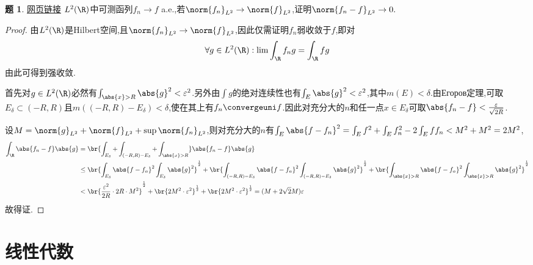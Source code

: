 \documentclass{article}
\theoremstyle{definition}
\newtheorem{exercise}{题}[section]
\begin{document}
\begin{exercise}
    \href{http://eufisky.is-programmer.com/tag/%E4%B8%98%E8%B5%9B}{网页链接}
    $L^2(\R)$中可测函列$f_n\to f$ a.e.,若$\norm{f_n}_{L^2}\to \norm{f}_{L^2}$,证明$\norm{f_n-f}_{L^2}\to 0.$
\end{exercise}
\begin{proof}
    由$L^2(\R)$是Hilbert空间,且$\norm{f_n}_{L^2}\to \norm{f}_{L^2}$,因此仅需证明$f_n$弱收敛于$f$,即对$$\forall g\in L^2(\R):\lim \int_\R f_ng=\int_{\R}fg$$由此可得到强收敛.

    首先对$g\in L^2(\R)$必然有$\int_{\abs{x}>R}\abs{g}^2<\varepsilon^2$.另外由$\int g$的绝对连续性也有$\int_{E}\abs{g}^2<\varepsilon^2$,其中$m(E)<\delta$.由Егоров定理,可取$E_\delta\subset (-R,R)$且$m((-R,R)-E_\delta)<\delta$,使在其上有$f_n\convergeuni f$.因此对充分大的$n$和任一点$x\in E_\delta$可取$\abs{f_n-f}<\frac{\varepsilon}{\sqrt{2R}}$.

    设$M=\norm{g}_{L^2}+\norm{f}_{L^2}+\sup\norm{f_n}_{L^2}$,则对充分大的$n$有$\int_{E}\abs{f-f_n}^2=\int_E f^2+\int_E f_n^2-2\int_E ff_n<M^2+M^2=2M^2$,
    $$\begin{aligned}
    \int_{\R}\abs{f_n-f}\abs{g}&=\br{\int_{E_\delta}+\int_{(-R,R)-E_\delta}+\int_{\abs{x}>R}}\abs{f_n-f}\abs{g}\\
    &\leq \br{\int_{E_\delta}\abs{f-f_n}^2\int_{E_\delta}\abs{g}^2}^{\frac{1}{2}}+\br{\int_{(-R,R)-E_\delta}\abs{f-f_n}^2\int_{(-R,R)-E_\delta}\abs{g}^2}^{\frac{1}{2}}+\br{\int_{\abs{x}>R}\abs{f-f_n}^2\int_{\abs{x}>R}\abs{g}^2}^{\frac{1}{2}}\\
    &<\br{\frac{\varepsilon^2}{2R}\cdot 2R\cdot M^2}^{\frac{1}{2}}+\br{2M^2\cdot \varepsilon^2}^{\frac{1}{2}}+\br{2M^2\cdot \varepsilon^2}^{\frac{1}{2}}=(M+2\sqrt{2}M)\varepsilon
    \end{aligned}$$
    故得证.
\end{proof}

\section{线性代数}
\end{document}
